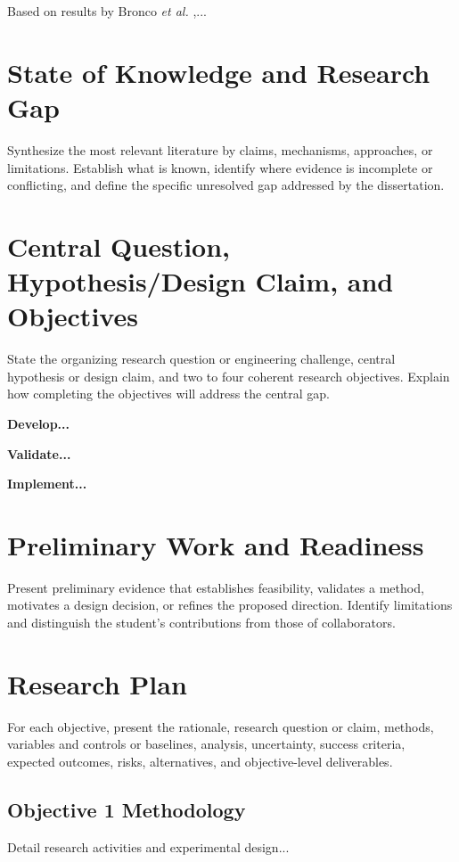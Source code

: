 \documentclass{eceproposal}
\begin{document}
Based on results by Bronco \textit{et al.} \cite{ece_2026_publication},... %

\section{State of Knowledge and Research Gap}
Synthesize the most relevant literature by claims, mechanisms, approaches, or limitations.
Establish what is known, identify where evidence is incomplete or conflicting, and define the specific
unresolved gap addressed by the dissertation.

\section{Central Question, Hypothesis/Design Claim, and Objectives}
State the organizing research question or engineering challenge, central hypothesis or design claim,
and two to four coherent research objectives.
Explain how completing the objectives will address the central gap.

\begin{objectiveslist}
  \item \textbf{Develop...}
  \item \textbf{Validate...}
  \item \textbf{Implement...}
\end{objectiveslist}

\section{Preliminary Work and Readiness}
Present preliminary evidence that establishes feasibility, validates a method, motivates a design decision, or
refines the proposed direction. Identify limitations and distinguish the student's contributions from those of collaborators.

\section{Research Plan}
For each objective, present the rationale, research question or claim, methods, variables and controls or baselines,
analysis, uncertainty, success criteria, expected outcomes, risks, alternatives, and objective-level deliverables.

\subsection{Objective 1 Methodology}
Detail research activities and experimental design...
\end{document}
